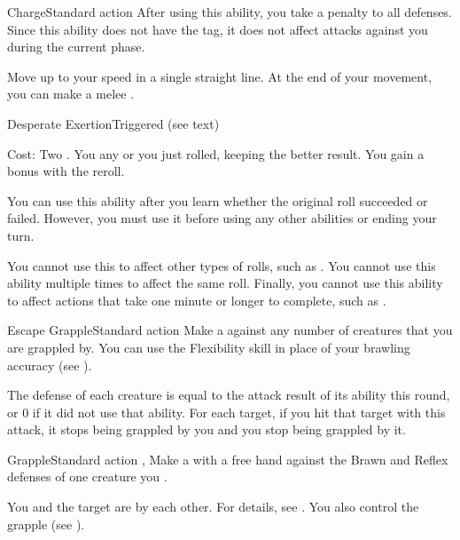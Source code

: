   \begin{activeability}{Charge}{Standard action}
    \rankline
    After using this ability, you  take a  penalty to all defenses.
    Since this ability does not have the  tag, it does not affect attacks against you during the current phase.

    Move up to your speed in a single straight line.
    At the end of your movement, you can make a melee .
  \end{activeability}

  \begin{triggeredability}{Desperate Exertion}{Triggered (see text)}
    \par \noindent Cost: Two .
    \rankline
    You  any  or  you just rolled, keeping the better result.
    You gain a  bonus with the reroll.

    You can use this ability after you learn whether the original roll succeeded or failed.
    However, you must use it before using any other abilities or ending your turn.

    You cannot use this to affect other types of rolls, such as .
    You cannot use this ability multiple times to affect the same roll.
    Finally, you cannot use this ability to affect actions that take one minute or longer to complete, such as .
  \end{triggeredability}

  \begin{activeability}{Escape Grapple}{Standard action}
    \abilitytags {}
    \rankline
    Make a  against any number of creatures that you are grappled by.
    You can use the Flexibility skill in place of your brawling accuracy (see ).

    The defense of each creature is equal to the attack result of its  ability this round, or 0 if it did not use that ability.
    For each target, if you hit that target with this attack, it stops being grappled by you and you stop being grappled by it.
  \end{activeability}

  \begin{activeability}{Grapple}{Standard action}
    \abilitytags {}, 
    \rankline
    Make a  with a free hand against the Brawn and Reflex defenses of one creature you .

    \hit You and the target are \grappled by each other.
    For details, see .
    \crit You also control the grapple (see ).
  \end{activeability}


